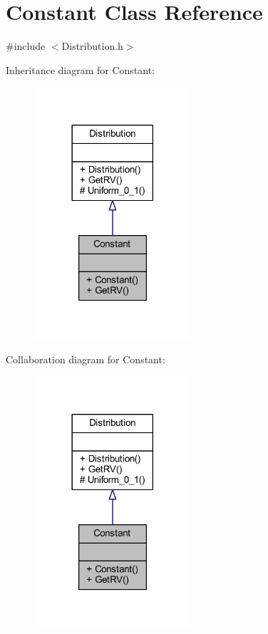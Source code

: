 \hypertarget{class_constant}{}\section{Constant Class Reference}
\label{class_constant}


{\ttfamily \#include $<$Distribution.\+h$>$}



Inheritance diagram for Constant\+:\nopagebreak
\begin{figure}[H]
\begin{center}
\leavevmode
\includegraphics[width=165pt]{class_constant__inherit__graph}
\end{center}
\end{figure}


Collaboration diagram for Constant\+:\nopagebreak
\begin{figure}[H]
\begin{center}
\leavevmode
\includegraphics[width=165pt]{class_constant__coll__graph}
\end{center}
\end{figure}
